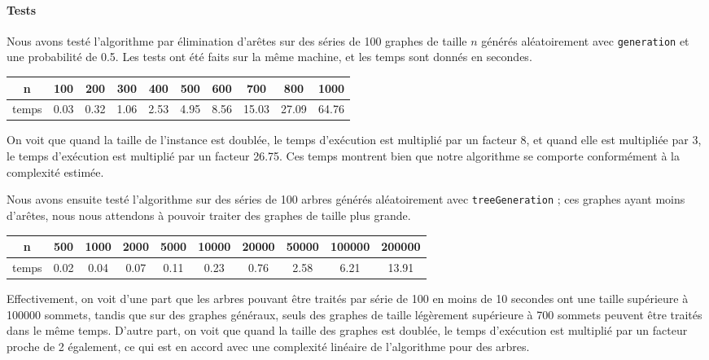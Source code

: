 \documentclass[a4paper,10pt]{article}
\begin{document}
\paragraph{Tests}
Nous avons testé l'algorithme par élimination d'arêtes sur des séries de 100 graphes de taille $n$ générés aléatoirement avec \texttt{generation} et une probabilité de 0.5. Les tests ont été faits sur la même machine, et les temps sont donnés en secondes.

\begin{center}
\begin{tabular}{|c|c|c|c|c|c|c|c|c|c|}
	\hline 
	n & 100 & 200 & 300 & 400 & 500 & 600 & 700 & 800 & 1000 \\
	\hline
	temps & 0.03 & 0.32 & 1.06 & 2.53 & 4.95 & 8.56 & 15.03 & 27.09 & 64.76 \\
	\hline
\end{tabular}
\end{center}

On voit que quand la taille de l'instance est doublée, le temps d'exécution est multiplié par un facteur 8, et quand elle est multipliée par 3, le temps d'exécution est multiplié par un facteur 26.75.
Ces temps montrent bien que notre algorithme se comporte conformément à la complexité estimée.

\bigskip
Nous avons ensuite testé l'algorithme sur des séries de 100 arbres générés aléatoirement avec \texttt{treeGeneration} ; ces graphes ayant moins d'arêtes, nous nous attendons à pouvoir traiter des graphes de taille plus grande.

\begin{center}
\begin{tabular}{|c|c|c|c|c|c|c|c|c|c|}
	\hline 
	n & 500 & 1000 & 2000 & 5000 & 10000 & 20000 & 50000 & 100000 & 200000\\
	\hline
	temps & 0.02 & 0.04 & 0.07 & 0.11 & 0.23 & 0.76 & 2.58 & 6.21 & 13.91\\
	\hline
\end{tabular}
\end{center}

Effectivement, on voit d'une part que les arbres pouvant être traités par série de 100 en moins de 10 secondes ont une taille supérieure à 100000 sommets, tandis que sur des graphes généraux, seuls des graphes de taille légèrement supérieure à 700 sommets peuvent être traités dans le même temps. D'autre part, on voit que quand la taille des graphes est doublée, le temps d'exécution est multiplié par un facteur proche de 2 également, ce qui est en accord avec une complexité linéaire de l'algorithme pour des arbres.
\end{document}
